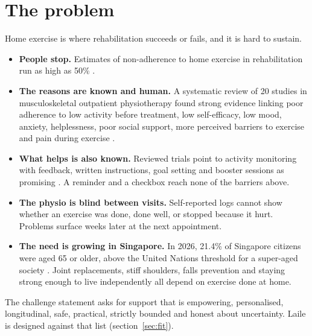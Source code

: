 \documentclass[11pt,a4paper]{article}
\begin{document}
\section{The problem}
Home exercise is where rehabilitation succeeds or fails, and it is hard to sustain.
\begin{itemize}
  \item \textbf{People stop.} Estimates of non-adherence to home exercise in rehabilitation run as high as 50\% \cite{argent2018}.
  \item \textbf{The reasons are known and human.} A systematic review of 20 studies in musculoskeletal outpatient physiotherapy found strong evidence linking poor adherence to low activity before treatment, low self-efficacy, low mood, anxiety, helplessness, poor social support, more perceived barriers to exercise and pain during exercise \cite{jack2010}.
  \item \textbf{What helps is also known.} Reviewed trials point to activity monitoring with feedback, written instructions, goal setting and booster sessions as promising \cite{peek2016}. A reminder and a checkbox reach none of the barriers above.
  \item \textbf{The physio is blind between visits.} Self-reported logs cannot show whether an exercise was done, done well, or stopped because it hurt. Problems surface weeks later at the next appointment.
  \item \textbf{The need is growing in Singapore.} In 2026, 21.4\% of Singapore citizens were aged 65 or older, above the United Nations threshold for a super-aged society \cite{nptd2026}. Joint replacements, stiff shoulders, falls prevention and staying strong enough to live independently all depend on exercise done at home.
\end{itemize}
The challenge statement asks for support that is empowering, personalised, longitudinal, safe, practical, strictly bounded and honest about uncertainty. Laile is designed against that list (section~\ref{sec:fit}).
\end{document}
